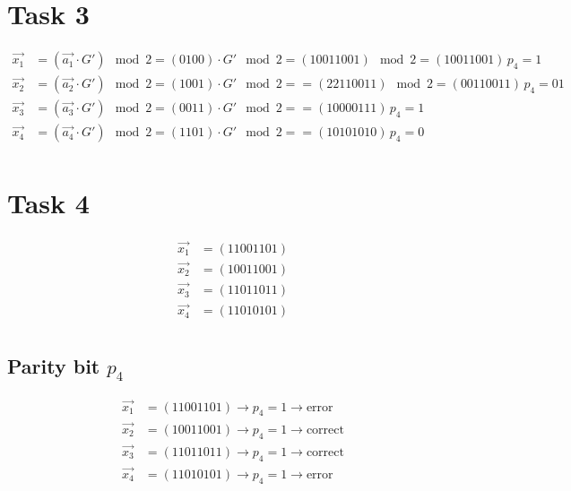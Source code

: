 \section*{Task 3}
\begin{align*}
  \vec{x_1} & = (\vec{a_1} \cdot G') \mod 2 = (0100) \cdot G' \mod 2 = (1 0 0 1 1 0 0 1) \mod 2 = (1 0 0 1 1 0 0 1) \,  p_4 = 1\\
  \vec{x_2} & = (\vec{a_2} \cdot G') \mod 2= (1001) \cdot G' \mod 2 = = (22110011) \mod 2 = (00110011) \, p_4 = 01                \\
  \vec{x_3} & = (\vec{a_3} \cdot G') \mod 2 = (0011) \cdot G' \mod 2 = = (10000111) \, p_4 = 1                                                            \\
  \vec{x_4} & = (\vec{a_4} \cdot G') \mod 2 = (1101) \cdot G' \mod 2 = = (10101010)  \, p_4 = 0                                                            \\
\end{align*}

\section*{Task 4}
\begin{align*}
  \vec{x_1} & = (1 1 0 0 1 1 0 1)\\
  \vec{x_2} & = (1 0 0 1 1 0 0 1)           \\
  \vec{x_3} & = (1 1 0 1 1 0 1 1)                                                          \\
  \vec{x_4} & = (1 1 0 1 0 1 0 1)                                                         \\
\end{align*}

\subsection*{Parity bit $p_4$}
\begin{align*}
  \vec{x_1} & = (1 1 0 0 1 1 0 1) \rightarrow p_4 = 1 \rightarrow \text{error}\\
  \vec{x_2} & = (1 0 0 1 1 0 0 1)  \rightarrow p_4 = 1 \rightarrow \text{correct}         \\
  \vec{x_3} & = (1 1 0 1 1 0 1 1)  \rightarrow p_4 = 1 \rightarrow \text{correct}                                                        \\
  \vec{x_4} & = (1 1 0 1 0 1 0 1)   \rightarrow p_4 = 1 \rightarrow \text{error}                                                      \\
\end{align*}

